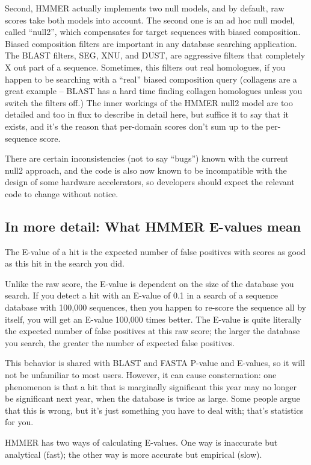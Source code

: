 \begin{itemize}
Second, HMMER actually implements two null models, and by default, raw
scores take both models into account. The second one is an ad hoc null
model, called ``null2'', which compensates for target sequences with
biased composition. Biased composition filters are important in any
database searching application. The BLAST filters, SEG, XNU, and DUST,
are aggressive filters that completely X out part of a
sequence. Sometimes, this filters out real homologues, if you happen
to be searching with a ``real'' biased composition query (collagens
are a great example -- BLAST has a hard time finding collagen
homologues unless you switch the filters off.) The inner workings of
the HMMER null2 model are too detailed and too in flux to describe in
detail here, but suffice it to say that it exists, and it's the reason
that per-domain scores don't sum up to the per-sequence score.  

There are certain inconsistencies (not to say ``bugs'') known with the
current null2 approach, and the code is also now known to be
incompatible with the design of some hardware accelerators, so
developers should expect the relevant code to change without notice.

\subsection{In more detail: What HMMER E-values mean}

The E-value of a hit is the expected number of false positives with
scores as good as this hit in the search you did.

Unlike the raw score, the E-value is dependent on the size of the
database you search. If you detect a hit with an E-value of 0.1 in a
search of a sequence database with 100,000 sequences, then you happen
to re-score the sequence all by itself, you will get an E-value
100,000 times better. The E-value is quite literally the expected
number of false positives at this raw score; the larger the database
you search, the greater the number of expected false positives.

This behavior is shared with BLAST and FASTA P-value and E-values, so
it will not be unfamiliar to most users. However, it can cause
consternation: one phenomenon is that a hit that is marginally
significant this year may no longer be significant next year, when the
database is twice as large. Some people argue that this is wrong, but
it's just something you have to deal with; that's statistics for you.

HMMER has two ways of calculating E-values. One way is inaccurate but
analytical (fast); the other way is more accurate but empirical
(slow).


\end{itemize}
